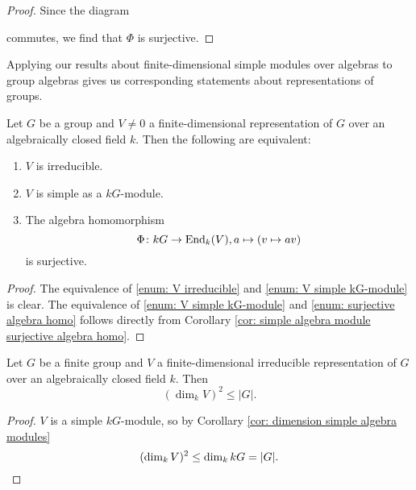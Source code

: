 \begin{proof}
  Since the diagram
  \begin{center}
  \end{center}
  commutes, we find that $\Phi$ is surjective.
\end{proof}


Applying our results about finite-dimensional simple modules over algebras to group algebras gives us corresponding statements about representations of groups.


\begin{lem}\label{lem: equivalence to irreducible}
  Let $G$ be a group and $V \neq 0$ a finite-dimensional representation of $G$ over an algebraically closed field $k$. Then the following are equivalent:
  \begin{enumerate}[label=\emph{\roman*)},leftmargin=*]
    \item \label{enum: V irreducible}
      $V$ is irreducible.
    \item \label{enum: V simple kG-module}
      $V$ is simple as a $kG$-module.
    \item \label{enum: surjective algebra homo}
      The algebra homomorphism
      \[
                \Phi
        \colon  kG
        \to     \operatorname{End}_k(V),
                a
        \mapsto (v \mapsto av)
      \]
      is surjective.
  \end{enumerate}
\end{lem}
\begin{proof}
  The equivalence of \ref{enum: V irreducible} and \ref{enum: V simple kG-module} is clear.
  The equivalence of \ref{enum: V simple kG-module} and \ref{enum: surjective algebra homo} follows directly from Corollary \ref{cor: simple algebra module surjective algebra homo}.
\end{proof}


\begin{cor}
  Let $G$ be a finite group and $V$ a finite-dimensional irreducible representation of $G$ over an algebraically closed field $k$.
  Then
  \[
          \left( \dim_k V \right)^2
    \leq |G|.
  \]
\end{cor}
\begin{proof}
  $V$ is a simple $kG$-module, so by Corollary \ref{cor: dimension simple algebra modules}
  \[
          (\dim_k V)^2
    \leq  \dim_k kG
    =     |G|.
    \qedhere
  \]
\end{proof}


